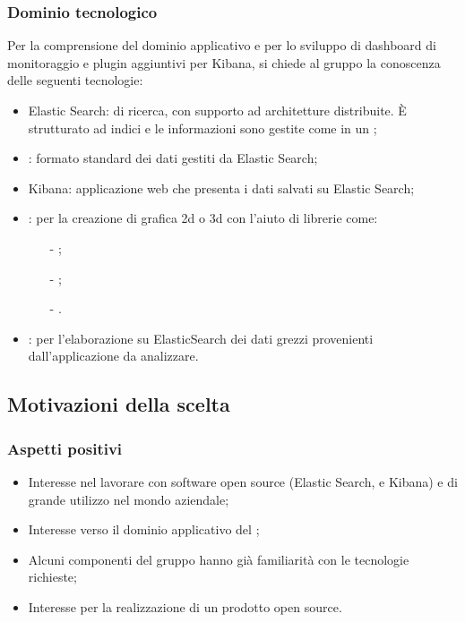 		\subsubsection{Dominio tecnologico}
		Per la comprensione del dominio applicativo e per lo sviluppo di dashboard di monitoraggio e plugin aggiuntivi per Kibana, si chiede al gruppo la conoscenza delle seguenti tecnologie:
		\begin{itemize}
			\item Elastic Search:  di ricerca, con supporto ad architetture distribuite. \MakeUppercase{è} strutturato ad indici e le informazioni sono gestite come in un  ;
			\item {}: formato standard dei dati gestiti da Elastic Search;
			\item Kibana: applicazione web che presenta i dati salvati su Elastic Search;
			\item {}: per la creazione di grafica 2d o 3d con l'aiuto di librerie come:
			\begin{itemize}
				\item[-] ;
				\item[-] ;
				\item[-] .
			\end{itemize}
			\item {}: per l'elaborazione su ElasticSearch dei dati grezzi provenienti dall'applicazione da analizzare.
		\end{itemize}
	\subsection{Motivazioni della scelta}
		\subsubsection{Aspetti positivi}
			\begin{itemize}
				\item Interesse nel lavorare con software open source (Elastic Search,  e Kibana) e di grande utilizzo nel mondo aziendale;
				\item Interesse verso il dominio applicativo del ;
				\item Alcuni componenti del gruppo hanno già familiarità con le tecnologie richieste;
				\item Interesse per la realizzazione di un prodotto open source.
			\end{itemize}
